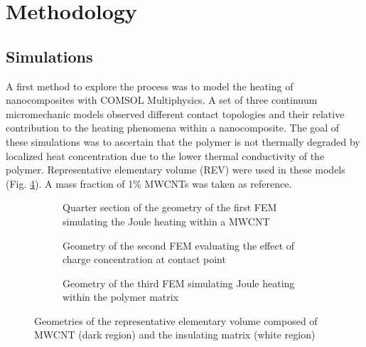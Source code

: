 \documentclass[11pt,review,times]{elsarticle}
\begin{document}
							\section{Methodology}

\subsection{Simulations}

A first method to explore the process was to model the heating of nanocomposites with COMSOL Mul\-ti\-phy\-sics\-\textregistered.  
A set of three continuum micromechanic models observed different contact topologies and their relative contribution to the heating phenomena within a nanocomposite. 
The goal of these simulations was to ascertain that the polymer is not thermally degraded by localized heat concentration due to the lower thermal conductivity of the polymer. 
Representative elementary volume (REV) were used in these models (Fig. \ref{fig:geometry}). 
A mass fraction of 1\% MWCNTs was taken as reference. 

\begin{figure}[htb]
	\center
	\begin{subfigure}{40mm}
		\center
		\captionsetup{width=35mm}
		\resizebox{35mm}{!}{
		
		}
		\caption{Quarter section of the geometry of the first FEM simulating the Joule heating within a MWCNT}
		\label{fig:geometry_axisymmetric}
	\end{subfigure}%
	\begin{subfigure}{55mm}
		\center
		\captionsetup{width=50mm}
		\resizebox{65mm}{!}{
		
		}
		\caption{Geometry of the second FEM evaluating the effect of charge concentration at contact point}
		\label{fig:geometry_3D}
	\end{subfigure}
	\begin{subfigure}{40mm}
		\center
		\captionsetup{width=40mm}
		\resizebox{35mm}{!}{
		
		}
		\caption{Geometry of the third FEM simulating Joule heating within the polymer matrix}
		\label{fig:geometry_gap}
	\end{subfigure} 
	\caption{Geometries of the representative elementary volume composed of MWCNT (dark region) and the insulating matrix (white region)}
	\label{fig:geometry}
\end{figure}
\end{document}
